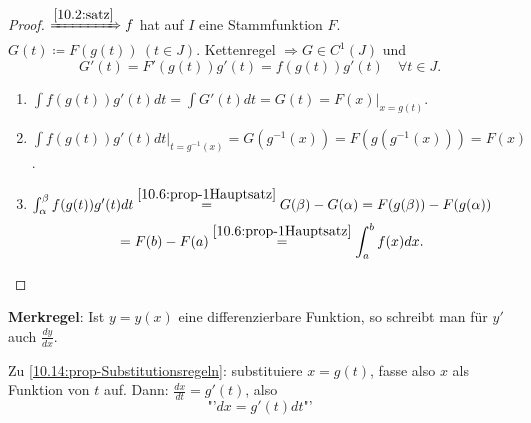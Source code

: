 \documentclass[12pt]{extreport} %
\theoremstyle{named}
\theoremstyle{dotless}
\begin{document}
\begin{proof}
	$\xRightarrow[]{\ref{10.2:satz}} f$ hat auf $I$ eine Stammfunktion $F$. $G(t) \coloneqq F(g(t)) ~ (t \in J)$. Kettenregel $\Rightarrow G \in C^{1}(J)$ und
	$$ G'(t) = F'(g(t)) g'(t) = f(g(t)) g'(t) \quad \forall t \in J. $$
	\begin{enumerate}
		\item $\int f(g(t)) g'(t) dt = \int G'(t) dt = G(t) = F(x) \Big|_{x=g(t)}$.
		\item $\int f(g(t)) g'(t) dt\Big|_{t = g^{-1}(x)} = G(g^{-1}(x)) = F(g(g^{-1}(x))) = F(x)$.
		\item $\int_{\alpha}^{\beta} f(g(t)) g'(t) dt \overset{\ref{10.6:prop-1Hauptsatz}}{=} G(\beta) - G(\alpha) = F(g(\beta)) - F(g(\alpha))$ 
		$$ = F(b) - F(a) \overset{\ref{10.6:prop-1Hauptsatz}}{=} \int_{a}^{b} f(x) dx. $$ 
	\end{enumerate}
\end{proof}


\textbf{Merkregel}:  Ist $y = y(x)$ eine differenzierbare Funktion, so schreibt man für $y'$ auch $\frac{dy}{dx}$.

Zu \ref{10.14:prop-Substitutionsregeln}: substituiere $x = g(t)$, fasse also $x$ als Funktion von $t$ auf. Dann: $\frac{dx}{dt} = g'(t)$, also
	$$ \text{"'} dx = g'(t) dt \text{"'} $$
\end{document}
